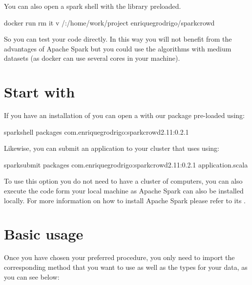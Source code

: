 \documentclass[letterpaper,10pt,english]{sphinxmanual}
\begin{document}
You can also open a spark shell with the library preloaded.

%
\begin{sphinxVerbatim}[commandchars=\\\{\}]
docker run \PYGZhy{}\PYGZhy{}rm \PYGZhy{}it \PYGZhy{}v /:/home/work/project enriquegrodrigo/spark\PYGZhy{}crowd
\end{sphinxVerbatim}

So you can test your code directly. In this way you will not benefit from the advantages of Apache Spark
but you could use the algorithms with medium datasets (as docker can use several cores in your machine).


\section{Start with }
\label{\detokenize{usage/quickstart:start-with-spark-packages}}
If you have an installation of   you can open a  with
our package pre-loaded using:

%
\begin{sphinxVerbatim}[commandchars=\\\{\}]
spark\PYGZhy{}shell \PYGZhy{}\PYGZhy{}packages com.enriquegrodrigo:spark\PYGZhy{}crowd\PYGZus{}2.11:0.2.1
\end{sphinxVerbatim}

Likewise, you can submit an application to your cluster that uses  using:

%
\begin{sphinxVerbatim}[commandchars=\\\{\}]
spark\PYGZhy{}submit \PYGZhy{}\PYGZhy{}packages com.enriquegrodrigo:spark\PYGZhy{}crowd\PYGZus{}2.11:0.2.1 application.scala
\end{sphinxVerbatim}

To use this option you do not need to have a cluster of computers, you can also execute the code form
your local machine as Apache Spark can also be installed locally. For more information on how to install
Apache Spark please refer to its .


\section{Basic usage}
\label{\detokenize{usage/quickstart:basic-usage}}
Once you have chosen your preferred procedure, you only need to import the corresponding method
that you want to use as well as the types for your data, as you can see below:
\end{document}
